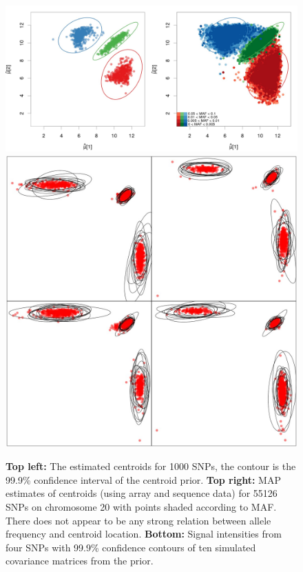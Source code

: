 \begin{figure}
  \begin{center} 
    \includegraphics[width=\textwidth]{chap2figs/SupFig5}\\
    \includegraphics[width=.8\textwidth]{chap2figs/SupFig6}
    \caption[Comparison of priors and MAP estimates for our genotype calling model]{\textbf{Top left:} The estimated centroids for 1000 SNPs, the contour is the 99.9\% confidence interval of the centroid prior. \textbf{Top right:} MAP estimates of centroids (using array and sequence data) for 55126 SNPs on chromosome 20 with points shaded according to MAF.  There does not appear to be any strong relation between allele frequency and centroid location. \textbf{Bottom:} Signal intensities from four SNPs with 99.9\% confidence contours of ten simulated covariance matrices from the prior.\label{priors1}}
  \end{center} 
\end{figure}

